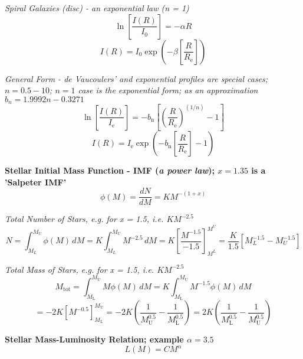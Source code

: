 \documentclass{spy}
\begin{document}
\textit {Spiral Galaxies (disc) - an exponential law (n = 1)}
\begin{equation}
\ln \left[ \frac {I(R)}{I_\mathrm{0}} \right] = - \alpha R
\end{equation}
\begin{equation}
I(R) = I_0 \exp\left(-\beta \left[\frac {R}{R_\mathrm{e}} \right]\right)
\end{equation}

\textit {General Form - de Vaucoulers' and exponential profiles are special cases; \(n = 0.5 - 10\); \(n = 1\) case is the exponential form; as an approximation  \(b_n = 1.9992n - 0.3271\)}
\begin{equation}
\ln \left[ \frac {I(R)}{I_\mathrm{e}} \right] = - b_\mathrm{n} \left[ \left( \frac {R}{R_\mathrm{e}} \right)^{(1/n)} - 1 \right]
\end{equation}
\begin{equation}
I(R) = I_\mathrm{e} \exp \left(- b_\mathrm{n} \left[ \frac{R}{R_\mathrm{e}} \right] - 1 \right)
\end{equation}

\textbf {Stellar Initial Mass Function - IMF (\textit {a power law}); \(x = 1.35\) is a 'Salpeter IMF'}
\begin{equation}
\phi (M) = \frac {dN}{dM} = K M^{-(1+x)}
\end{equation}

\textit {Total Number of Stars, e.g. for x = 1.5, i.e. \(KM^{-2.5}\)}
\begin{equation}
N =  \int_{M_L}^{M_U} \phi(M) \,dM
= K \int_{M_L}^{M_U} M^{-2.5} \,dM 
= K \left[ \frac{M^{-1.5}}{-1.5} \right]^{M^U}_{M^L}
= \frac{K}{1.5} \left[M^{-1.5}_L - M^{-1.5}_U \right]
\end{equation}

\textit {Total Mass of Stars, e.g. for x = 1.5, i.e. \(KM^{-2.5}\)}
\begin{equation}
M_\mathrm{tot} =  \int_{M_\mathrm{L}}^{M_\mathrm{U}} M \phi(M) \,dM =  K \int_{M_\mathrm{L}}^{M_\mathrm{U}} M^{-1.5} \phi(M) \,dM
\end{equation}
\begin{equation}
=  -2K \left[M^{-0.5}\right]^{M_\mathrm{U}}_{M_\mathrm{L}} = -2K \left( \frac {1}{M^{0.5}_\mathrm{U}} - \frac {1}{M^{0.5}_\mathrm{L}}\right) = 2K \left( \frac {1}{M^{0.5}_\mathrm{L}} - \frac {1}{M^{0.5}_\mathrm{U}}\right)
\end{equation}


\textbf {Stellar Mass-Luminosity Relation; example \(\alpha = 3.5\)}
\begin{equation}
L (M) = C M^\alpha
\end{equation}
\end{document}
